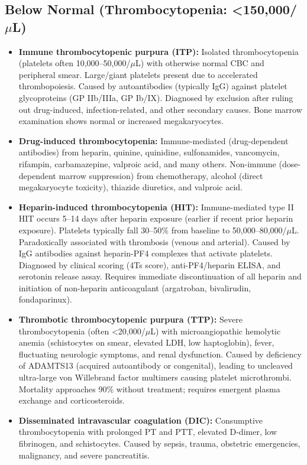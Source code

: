 \subsection*{Below Normal (Thrombocytopenia: <150,000/$\mu$L)}
\begin{itemize}
  \item \textbf{Immune thrombocytopenic purpura (ITP):} Isolated thrombocytopenia (platelets often 10,000--50,000/$\mu$L) with otherwise normal CBC and peripheral smear. Large/giant platelets present due to accelerated thrombopoiesis. Caused by autoantibodies (typically IgG) against platelet glycoproteins (GP IIb/IIIa, GP Ib/IX). Diagnosed by exclusion after ruling out drug-induced, infection-related, and other secondary causes. Bone marrow examination shows normal or increased megakaryocytes.
  \item \textbf{Drug-induced thrombocytopenia:} Immune-mediated (drug-dependent antibodies) from heparin, quinine, quinidine, sulfonamides, vancomycin, rifampin, carbamazepine, valproic acid, and many others. Non-immune (dose-dependent marrow suppression) from chemotherapy, alcohol (direct megakaryocyte toxicity), thiazide diuretics, and valproic acid.
  \item \textbf{Heparin-induced thrombocytopenia (HIT):} Immune-mediated type II HIT occurs 5--14 days after heparin exposure (earlier if recent prior heparin exposure). Platelets typically fall 30--50\% from baseline to 50,000--80,000/$\mu$L. Paradoxically associated with thrombosis (venous and arterial). Caused by IgG antibodies against heparin-PF4 complexes that activate platelets. Diagnosed by clinical scoring (4Ts score), anti-PF4/heparin ELISA, and serotonin release assay. Requires immediate discontinuation of all heparin and initiation of non-heparin anticoagulant (argatroban, bivalirudin, fondaparinux).
  \item \textbf{Thrombotic thrombocytopenic purpura (TTP):} Severe thrombocytopenia (often <20,000/$\mu$L) with microangiopathic hemolytic anemia (schistocytes on smear, elevated LDH, low haptoglobin), fever, fluctuating neurologic symptoms, and renal dysfunction. Caused by deficiency of ADAMTS13 (acquired autoantibody or congenital), leading to uncleaved ultra-large von Willebrand factor multimers causing platelet microthrombi. Mortality approaches 90\% without treatment; requires emergent plasma exchange and corticosteroids.
  \item \textbf{Disseminated intravascular coagulation (DIC):} Consumptive thrombocytopenia with prolonged PT and PTT, elevated D-dimer, low fibrinogen, and schistocytes. Caused by sepsis, trauma, obstetric emergencies, malignancy, and severe pancreatitis.

\end{itemize}
